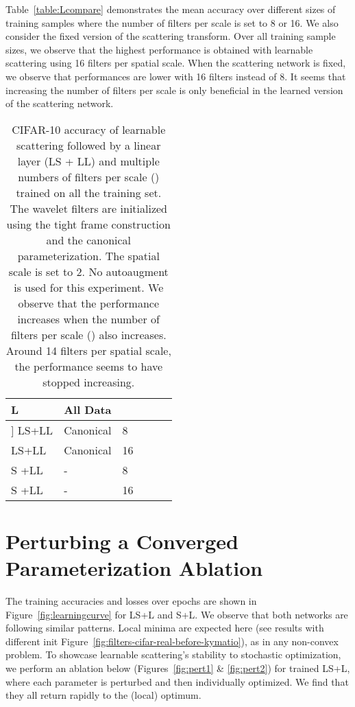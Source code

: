 \documentclass[10pt,twocolumn,letterpaper]{article}
\begin{document}
\begin{table*}[t]
Table~\ref{table:Lcompare} demonstrates the mean accuracy over different sizes of training samples where the number of filters per scale is set to 8 or 16. We also consider the fixed version of the scattering transform. Over all training sample sizes, we observe that the highest performance is obtained with learnable scattering using 16 filters per spatial scale. When the scattering network is fixed, we observe that performances are lower with 16 filters instead of 8. It seems that increasing the number of filters per scale is only beneficial in the learned version of the scattering network. 


\begin{table}[H] 
    \centering
    \caption{CIFAR-10 accuracy of learnable scattering followed by a linear layer (LS + LL) and multiple numbers of filters per scale () trained on all the training set. The wavelet filters are initialized using the tight frame construction and the canonical parameterization. The spatial scale is set to 2. No autoaugment is used for this experiment. We observe that the performance increases when the number of filters per scale () also increases. Around 14 filters per spatial scale, the performance seems to have stopped increasing. } 
    \label{table:L}
    \fontsize{9}{9}\selectfont 
    \begin{tabularx}{0.15\linewidth}{ll} 
          \hline
         L & All Data\\
        \hline
        \-2mm]
        LS+LL&Canonical& 8& &  
        &&\\ 
        LS+LL&Canonical& 16& & 
         && \\ 
        S +LL&-&8 & &  && \\
        S +LL&-&16 & 	 &   &  & \\
        \hline
    \end{tabularx}
\end{table} 


\section{Perturbing a Converged Parameterization Ablation}

The training accuracies and losses over epochs are shown in Figure~\ref{fig:learningcurve} for LS+L and S+L. We observe that both networks are following similar patterns. Local minima are expected here (see results with different init Figure~\ref{fig:filters-cifar-real-before-kymatio}), as in any non-convex problem. To showcase learnable scattering's stability to stochastic optimization, we perform an ablation below (Figures~\ref{fig:pert1} \& \ref{fig:pert2}) for trained LS+L, where each parameter is perturbed and then individually optimized. We find that they all return rapidly to the (local) optimum.





\end{table*}
\end{document}
